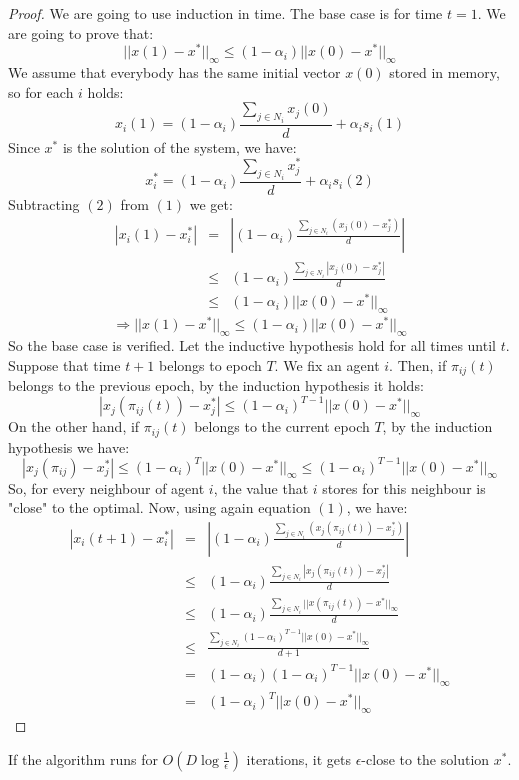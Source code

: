 \begin{proof}
We are going to use induction in time. The base case is for time $t=1$. We are going to prove that: $$ ||x(1)-x^*||_{\infty} \leq (1-\alpha_i)||x(0)-x^*||_{\infty}$$
We assume that everybody has the same initial vector $x(0)$ stored in memory, so for each $i$ holds:
$$x_i(1) = (1-\alpha_i)\frac{\sum_{j \in N_i}x_j(0)}{d}+\alpha_i s_i (1)$$Since $x^*$ is the solution of the system, we have:
$$ x_i^* = (1-\alpha_i)\frac{\sum_{j \in N_i}x_j^*}{d}+\alpha_i s_i (2)$$
Subtracting $(2)$ from $(1)$ we get:
\begin{eqnarray*}
|x_i(1) - x_i^*| &=& |(1-\alpha_i)\frac{\sum_{j \in N_i}(x_j(0)-x_j^*)}{d}|\\
&\leq& (1-\alpha_i)\frac{\sum_{j \in N_i}|x_j(0)-x_j^*|}{d} \\
&\leq& (1-\alpha_i) ||x(0)-x^*||_{\infty}
\end{eqnarray*}
$$ \Rightarrow ||x(1)-x^*||_{\infty} \leq (1-\alpha_i)||x(0)-x^*||_{\infty}$$
So the base case is verified. Let the inductive hypothesis hold for all times until $t$. Suppose that time $t+1$ belongs to epoch $T$. We fix an agent $i$. Then, if $\pi_{ij}(t)$ belongs to the previous epoch, by the induction hypothesis it holds:
$$ |x_j(\pi_{ij}(t)) - x_j^*| \leq \left( 1-\alpha_i\right)^{T-1}||x(0)-x^*||_{\infty}$$
 On the other hand, if $\pi_{ij}(t)$ belongs to the current epoch $T$, by the induction hypothesis we have:
 $$ |x_j(\pi_{ij}) - x_j^*| \leq \left( 1-\alpha_i\right)^{T}||x(0)-x^*||_{\infty} \leq \left( 1-\alpha_i\right)^{T-1}||x(0)-x^*||_{\infty}$$
 So, for every neighbour of agent $i$, the value that $i$ stores for this neighbour is "close" to the optimal. Now, using again equation $(1)$, we have:
 \begin{eqnarray*}
|x_i(t+1) - x_i^*| &=& |(1-\alpha_i)\frac{\sum_{j \in N_i}(x_j(\pi_{ij}(t))-x_j^*)}{d}|\\
&\leq& (1-\alpha_i)\frac{\sum_{j \in N_i}|x_j(\pi_{ij}(t))-x_j^*|}{d}\\
&\leq& (1-\alpha_i)\frac{\sum_{j \in N_i}||x(\pi_{ij}(t))-x^*||_\infty}{d}\\
&\leq& \frac{\sum_{j \in N_i}\left(1-\alpha_i\right)^{T-1}||x(0)-x^*||_{\infty}}{d+1}\\
&=& (1-\alpha_i)\left(1-\alpha_i\right)^{T-1}||x(0)-x^*||_{\infty}\\
&=& \left(1-\alpha_i\right)^{T}||x(0)-x^*||_{\infty}
 \end{eqnarray*}

\end{proof}

\begin{corollary}
If the algorithm runs for $O(D \log \frac{1}{\epsilon})$ iterations, it gets $\epsilon$-close to the solution $x^*$.
\end{corollary}
